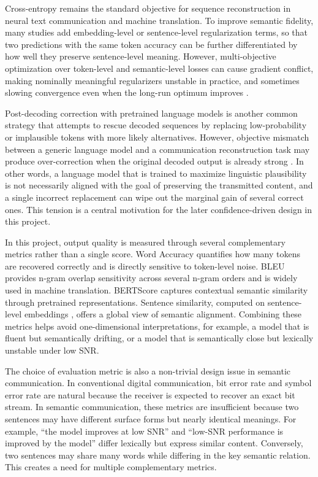 Cross-entropy remains the standard objective for sequence reconstruction in neural text communication and machine translation. To improve semantic fidelity, many studies add embedding-level or sentence-level regularization terms, so that two predictions with the same token accuracy can be further differentiated by how well they preserve sentence-level meaning. However, multi-objective optimization over token-level and semantic-level losses can cause gradient conflict, making nominally meaningful regularizers unstable in practice, and sometimes slowing convergence even when the long-run optimum improves \cite{kendall2018mtl, chen2018gradnorm}.

Post-decoding correction with pretrained language models is another common strategy that attempts to rescue decoded sequences by replacing low-probability or implausible tokens with more likely alternatives. However, objective mismatch between a generic language model and a communication reconstruction task may produce over-correction when the original decoded output is already strong \cite{devlin2019bert, sanh2019distilbert}. In other words, a language model that is trained to maximize linguistic plausibility is not necessarily aligned with the goal of preserving the transmitted content, and a single incorrect replacement can wipe out the marginal gain of several correct ones. This tension is a central motivation for the later confidence-driven design in this project.

In this project, output quality is measured through several complementary metrics rather than a single score. Word Accuracy quantifies how many tokens are recovered correctly and is directly sensitive to token-level noise. BLEU \cite{papineni2002bleu} provides n-gram overlap sensitivity across several n-gram orders and is widely used in machine translation. BERTScore \cite{zhang2020bertscore} captures contextual semantic similarity through pretrained representations. Sentence similarity, computed on sentence-level embeddings \cite{reimers2019sbert, gao2021simcse}, offers a global view of semantic alignment. Combining these metrics helps avoid one-dimensional interpretations, for example, a model that is fluent but semantically drifting, or a model that is semantically close but lexically unstable under low SNR.

The choice of evaluation metric is also a non-trivial design issue in semantic communication. In conventional digital communication, bit error rate and symbol error rate are natural because the receiver is expected to recover an exact bit stream. In semantic communication, these metrics are insufficient because two sentences may have different surface forms but nearly identical meanings. For example, ``the model improves at low SNR'' and ``low-SNR performance is improved by the model'' differ lexically but express similar content. Conversely, two sentences may share many words while differing in the key semantic relation. This creates a need for multiple complementary metrics.


